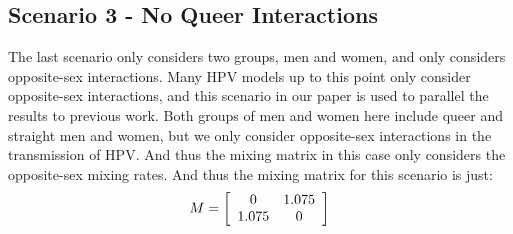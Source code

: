 \documentclass[12pt]{article}
\begin{document}
\subsection{Scenario 3 - No Queer Interactions}
The last scenario only considers two groups, men and women, and only considers opposite-sex interactions.  Many HPV models up to this point only consider opposite-sex interactions, and this scenario in our paper is used to parallel the results to previous work.  Both groups of men and women here include queer and straight men and women, but we only consider opposite-sex interactions in the transmission of HPV. And thus the mixing matrix in this case only considers the opposite-sex mixing rates.  And thus the mixing matrix for this scenario is just:
\begin{equation}
M=\left[\begin{array}{c c}
0 & 1.075 \\
1.075 & 0
\end{array}\right]
\end{equation}
\end{document}
